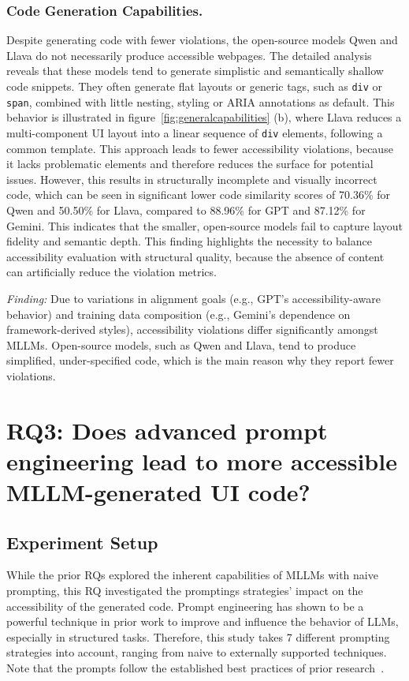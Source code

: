 \subsubsection{Code Generation Capabilities.} Despite generating
code with fewer violations, the open-source models Qwen and 
Llava do not necessarily produce accessible webpages.
The detailed analysis reveals that these models tend to generate 
simplistic and semantically shallow code snippets. They often 
generate flat layouts or generic tags, such as \texttt{div} or \texttt{span},
combined with little nesting, styling or ARIA annotations as default. 
This behavior is illustrated in figure~\ref{fig:generalcapabilities} (b),
where Llava reduces a multi-component UI layout into a linear 
sequence of \texttt{div} elements, following a common template.
This approach leads to fewer accessibility violations, 
because it lacks problematic elements and therefore reduces the 
surface for potential issues. However, this results in 
structurally incomplete and visually incorrect code, which can be 
seen in significant lower code similarity scores of 70.36\% for Qwen and
50.50\% for Llava, compared to 88.96\% for GPT and 87.12\% for Gemini.
This indicates that the smaller, open-source models fail to capture 
layout fidelity and semantic depth. This finding highlights the 
necessity to balance accessibility evaluation with structural 
quality, because the absence of content can artificially 
reduce the violation metrics.

\begin{center}
\begin{tcolorbox}[colback=black!5!white,colframe=black!75!black,bottom=-0.05pt,top=-0.05pt]
\textit{Finding:} Due to variations in alignment goals (e.g., GPT's accessibility-aware behavior) and training data composition (e.g., Gemini's dependence on framework-derived styles), accessibility violations differ significantly amongst MLLMs. Open-source models, such as Qwen and Llava, tend to produce simplified, under-specified code, which is the main reason why they report fewer violations.
\end{tcolorbox}
\end{center}


\section{RQ3: Does advanced prompt engineering lead to more accessible MLLM-generated
UI code?}
\subsection{Experiment Setup}
While the prior RQs explored the inherent capabilities of MLLMs with naive
prompting, this RQ investigated the promptings strategies' impact 
on the accessibility of the generated code. Prompt engineering has shown 
to be a powerful technique in prior work to improve and influence the 
behavior of LLMs, especially in structured tasks. Therefore, this study 
takes 7 different prompting strategies into account, ranging from 
naive to externally supported techniques. Note that the prompts follow 
the established best practices of prior research~\cite{suh2025accessiblecode, xiao2024interaction2code}.


